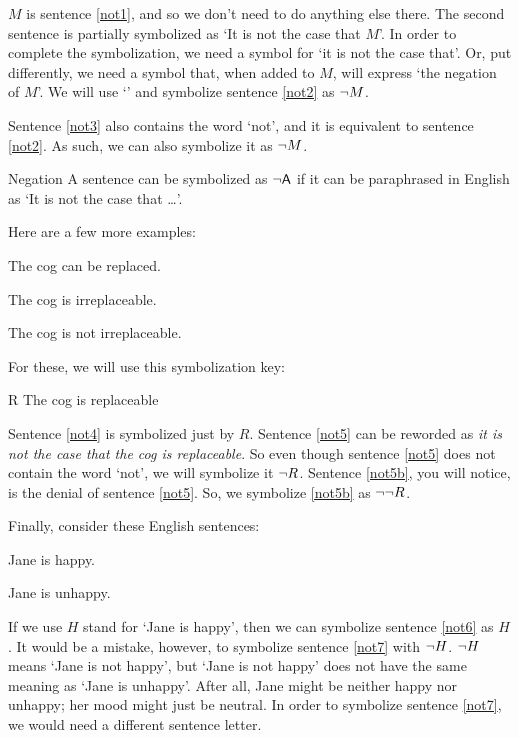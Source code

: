 $M$ is sentence \ref{not1}, and so we don't need to do anything else there. 
The second sentence is partially symbolized as `It is not the case that $M$'. In order to complete the symbolization, we need a symbol for `it is not the case that'. Or, put differently, we need a symbol that, when added to $M$, will express `the negation of $M$'. We will use `\enot' and symbolize sentence \ref{not2} as ${\neg} M$.

Sentence \ref{not3} also contains the word `not', and it is equivalent to sentence \ref{not2}. As such, we can also symbolize it as ${\neg} M$.

\begin{factboxy}{Negation}
A sentence can be symbolized as ${\neg}\mathsf{A}$ if it can be paraphrased in English as `It is not the case that \ldots'.
\end{factboxy}

Here are a few more examples:
	\begin{earg}
		\item[\ex{not4}] The cog can be replaced.
		\item[\ex{not5}] The cog is irreplaceable.
		\item[\ex{not5b}] The cog is not irreplaceable.
	\end{earg}
For these, we will use this symbolization key:
	\begin{ekey}
		\item[R] The cog is replaceable
	\end{ekey}
Sentence \ref{not4} is symbolized just by $R$. Sentence \ref{not5} can be reworded as \textit{it is not the case that the cog is replaceable}. So even though sentence \ref{not5} does not contain the word `not', we will symbolize it ${\neg} R$.
Sentence \ref{not5b}, you will notice, is the denial of sentence \ref{not5}. So, we symbolize \ref{not5b} as ${\neg}{\neg} R$.

Finally, consider these English sentences:
	\begin{earg}
		\item[\ex{not6}] Jane is happy.
		\item[\ex{not7}] Jane is unhappy.
	\end{earg}
If we use $H$ stand for `Jane is happy', then we can symbolize sentence \ref{not6} as $H$. It would be a mistake, however, to symbolize sentence \ref{not7} with ${\neg}{H}$. 
${\neg}{H}$ means `Jane is not happy', but `Jane is not happy' does not have the same meaning as `Jane is unhappy'. After all, Jane might be neither happy nor unhappy; her mood might just be neutral. In order to symbolize sentence \ref{not7}, we would need a different sentence letter.


